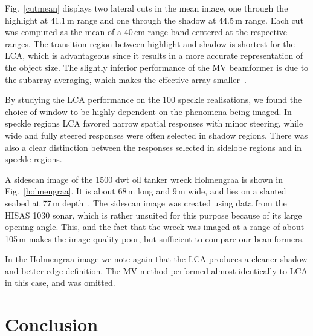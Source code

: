 \documentclass[10pt,journal,draftclsnofoot,onecolumn]{IEEEtran}
\newcommand\Fig[1]{Fig.~\ref{#1}}
\newcommand\1{\vec 1}
\begin{document}
\Fig{cutmean} displays two lateral cuts in the mean image, one through the highlight at 41.1\,m range and one through the shadow at 44.5\,m range. Each cut was computed as the mean of a 40\,cm range band centered at the respective ranges. The transition region between highlight and shadow is shortest for the LCA, which is advantageous since it results in a more accurate representation of the object size. The slightly inferior performance of the MV beamformer is due to the subarray averaging, which makes the effective array smaller~\cite{syn07}.

By studying the LCA performance on the 100 speckle realisations, we found the choice of window to be highly dependent on the phenomena being imaged. In speckle regions LCA favored narrow spatial responses with minor steering, while wide and fully steered responses were often selected in shadow regions. There was also a clear distinction between the responses selected in sidelobe regions and in speckle regions.


A sidescan image of the 1500 dwt oil tanker wreck Holmengraa is shown in \Fig{holmengraa}. It is about 68\,m long and 9\,m wide, and lies on a slanted seabed at 77\,m depth~\cite{holmengraa}. The sidescan image was created using data from the HISAS 1030 sonar, which is rather unsuited for this purpose because of its large opening angle. This, and the fact that the wreck was imaged at a range of about 105\,m makes the image quality poor, but sufficient to compare our beamformers. 

In the Holmengraa image we note again that the LCA produces a cleaner shadow and better edge definition. The MV method performed almost identically to LCA in this case, and was omitted.


\section{Conclusion}
\end{document}
